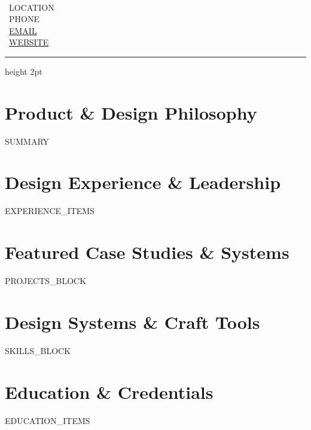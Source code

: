 \documentclass[10pt,letterpaper]{article}
\begin{document}
\begin{minipage}[t]{0.64\textwidth}
  {\Huge \textbf{}} \\[4pt]
  {\normalsize \textbf{}}
\end{minipage}
\hfill
\begin{minipage}[t]{0.34\textwidth}
  \raggedleft \small
  \faMapMarker* \ {{LOCATION}} \\
  \faPhone \ {{PHONE}} \\
  \faEnvelope \ \href{mailto:{{EMAIL}}}{{{EMAIL}}} \\
  \faGlobe \ \href{https://{{WEBSITE}}}{{{WEBSITE}}}
\end{minipage}

\vspace{6pt}
{\color{terracotta}\hrule height 2pt}
\vspace{6pt}

\section{\faUser\hspace{0.4em} Product \& Design Philosophy}
\small
{{SUMMARY}}

\section{\faBriefcase\hspace{0.4em} Design Experience \& Leadership}
\small
{{EXPERIENCE_ITEMS}}

\section{\faFolderOpen\hspace{0.4em} Featured Case Studies \& Systems}
\small
{{PROJECTS_BLOCK}}

\section{\faTools\hspace{0.4em} Design Systems \& Craft Tools}
\small
{{SKILLS_BLOCK}}

\section{\faGraduationCap\hspace{0.4em} Education \& Credentials}
\small
{{EDUCATION_ITEMS}}
\end{document}
